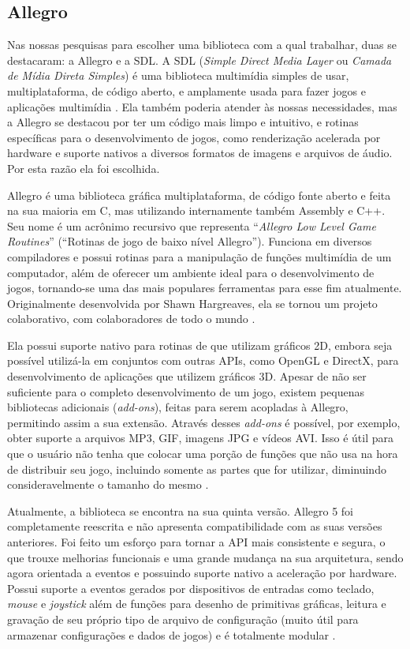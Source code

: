 \subsection{Allegro}
\label{allegro}
%
Nas nossas pesquisas para escolher uma biblioteca com a qual trabalhar, duas se destacaram: a Allegro e a SDL. A SDL (\textit{Simple Direct Media Layer} ou \textit{Camada de Mídia Direta Simples}) é uma biblioteca multimídia simples de usar, multiplataforma, de código aberto, e amplamente usada para fazer jogos e aplicações multimídia \cite{SDLDoc}. Ela também poderia atender às nossas necessidades, mas a Allegro se destacou por ter um código mais limpo e intuitivo, e rotinas específicas para o desenvolvimento de jogos, como renderização acelerada por hardware e suporte nativos a diversos formatos de imagens e arquivos de áudio. Por esta razão ela foi escolhida.
\par 
Allegro é uma biblioteca gráfica multiplataforma, de código fonte aberto e feita na sua maioria em C, mas utilizando internamente também Assembly e C++. Seu nome é um acrônimo recursivo que representa ``\textit{Allegro Low Level Game Routines}'' (``Rotinas de jogo de baixo nível Allegro''). Funciona em diversos compiladores e possui rotinas para a manipulação de funções multimídia de um computador, além de oferecer um ambiente ideal para o desenvolvimento de jogos, tornando-se uma das mais populares ferramentas para esse fim atualmente. Originalmente desenvolvida por Shawn Hargreaves, ela se tornou um projeto colaborativo, com colaboradores de todo o mundo \cite{AllegroDoc}.
\par
Ela possui suporte nativo para rotinas de que utilizam gráficos 2D, embora seja possível utilizá-la em conjuntos com outras APIs, como OpenGL e DirectX, para desenvolvimento de aplicações que utilizem gráficos 3D. Apesar de não ser suficiente para o completo desenvolvimento de um jogo, existem pequenas bibliotecas adicionais (\textit{add-ons}), feitas para serem acopladas à Allegro, permitindo assim a sua extensão. Através desses \textit{add-ons} é possível, por exemplo, obter suporte a arquivos MP3, GIF, imagens JPG e vídeos AVI. Isso é útil para que o usuário não tenha que colocar uma porção de funções que não usa na hora de distribuir seu jogo, incluindo somente as partes que for utilizar, diminuindo consideravelmente o tamanho do mesmo \cite{AllegroDoc}.
\par
Atualmente, a biblioteca se encontra na sua quinta versão. Allegro 5 foi completamente reescrita e não apresenta compatibilidade com as suas versões anteriores. Foi feito um esforço para tornar a API mais consistente e segura, o que trouxe melhorias funcionais e uma grande mudança na sua arquitetura, sendo agora orientada a eventos e possuindo suporte nativo a aceleração por hardware. Possui suporte a eventos gerados por dispositivos de entradas como teclado, \textit{mouse} e \textit{joystick} além de funções para desenho de primitivas gráficas, leitura e gravação de seu próprio tipo de arquivo de configuração (muito útil para armazenar configurações e dados de jogos) e é totalmente modular \cite{AllegroDoc}.
